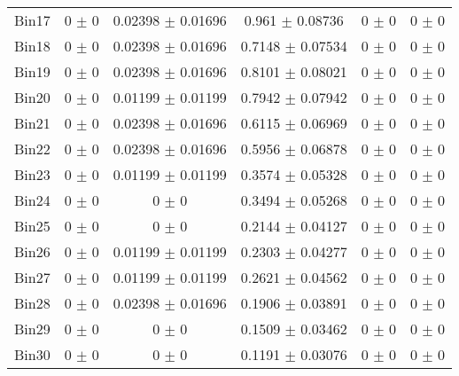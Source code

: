 \begin{tabular}{@{\extracolsep{4pt}}lccccc@{}}
     Bin17 & 0 $\pm$ 0 & 0.02398 $\pm$ 0.01696 & 0.961 $\pm$ 0.08736 & 0 $\pm$ 0 & 0 $\pm$ 0 \\ 
     Bin18 & 0 $\pm$ 0 & 0.02398 $\pm$ 0.01696 & 0.7148 $\pm$ 0.07534 & 0 $\pm$ 0 & 0 $\pm$ 0 \\ 
     Bin19 & 0 $\pm$ 0 & 0.02398 $\pm$ 0.01696 & 0.8101 $\pm$ 0.08021 & 0 $\pm$ 0 & 0 $\pm$ 0 \\ 
     Bin20 & 0 $\pm$ 0 & 0.01199 $\pm$ 0.01199 & 0.7942 $\pm$ 0.07942 & 0 $\pm$ 0 & 0 $\pm$ 0 \\ 
     Bin21 & 0 $\pm$ 0 & 0.02398 $\pm$ 0.01696 & 0.6115 $\pm$ 0.06969 & 0 $\pm$ 0 & 0 $\pm$ 0 \\ 
     Bin22 & 0 $\pm$ 0 & 0.02398 $\pm$ 0.01696 & 0.5956 $\pm$ 0.06878 & 0 $\pm$ 0 & 0 $\pm$ 0 \\ 
     Bin23 & 0 $\pm$ 0 & 0.01199 $\pm$ 0.01199 & 0.3574 $\pm$ 0.05328 & 0 $\pm$ 0 & 0 $\pm$ 0 \\ 
     Bin24 & 0 $\pm$ 0 & 0 $\pm$ 0 & 0.3494 $\pm$ 0.05268 & 0 $\pm$ 0 & 0 $\pm$ 0 \\ 
     Bin25 & 0 $\pm$ 0 & 0 $\pm$ 0 & 0.2144 $\pm$ 0.04127 & 0 $\pm$ 0 & 0 $\pm$ 0 \\ 
     Bin26 & 0 $\pm$ 0 & 0.01199 $\pm$ 0.01199 & 0.2303 $\pm$ 0.04277 & 0 $\pm$ 0 & 0 $\pm$ 0 \\ 
     Bin27 & 0 $\pm$ 0 & 0.01199 $\pm$ 0.01199 & 0.2621 $\pm$ 0.04562 & 0 $\pm$ 0 & 0 $\pm$ 0 \\ 
     Bin28 & 0 $\pm$ 0 & 0.02398 $\pm$ 0.01696 & 0.1906 $\pm$ 0.03891 & 0 $\pm$ 0 & 0 $\pm$ 0 \\ 
     Bin29 & 0 $\pm$ 0 & 0 $\pm$ 0 & 0.1509 $\pm$ 0.03462 & 0 $\pm$ 0 & 0 $\pm$ 0 \\ 
     Bin30 & 0 $\pm$ 0 & 0 $\pm$ 0 & 0.1191 $\pm$ 0.03076 & 0 $\pm$ 0 & 0 $\pm$ 0 \\ 
\hline\hline
  \end{tabular}
